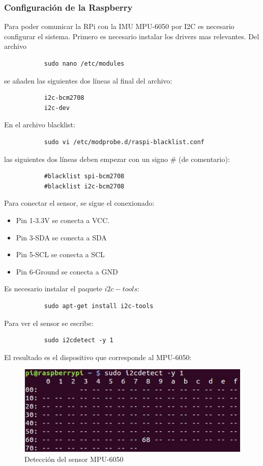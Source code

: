 \documentclass[twoside,11pt]{book}
\begin{document}
\subsubsection*{Configuración de la Raspberry}
Para poder comunicar la RPi con la IMU MPU-6050 por I2C es necesario configurar el sistema. Primero es necesario instalar los drivers mas relevantes. Del archivo
\begin{verbatim}
           sudo nano /etc/modules
\end{verbatim}
se añaden las siguientes dos líneas al final del archivo:
\begin{verbatim}
           i2c-bcm2708
           i2c-dev
\end{verbatim}
En el archivo blacklist:
\begin{verbatim}
           sudo vi /etc/modprobe.d/raspi-blacklist.conf
\end{verbatim}
las siguientes dos líneas deben empezar con un signo \# (de comentario):
\begin{verbatim}
           #blacklist spi-bcm2708
           #blacklist i2c-bcm2708
\end{verbatim}
Para conectar el sensor, se sigue el conexionado:

\begin{itemize}
\item Pin 1-3.3V se conecta a VCC.
\item Pin 3-SDA se conecta a SDA
\item Pin 5-SCL se conecta a SCL
\item Pin 6-Ground se conecta a GND
\end{itemize} 
Es necesario instalar el paquete $i2c-tools$:
\begin{verbatim}
           sudo apt-get install i2c-tools
\end{verbatim}
Para ver el sensor se escribe:
\begin{verbatim}
           sudo i2cdetect -y 1
\end{verbatim}
El resultado es el dispositivo que corresponde al MPU-6050:

\begin{figure}[h!]
\begin{center}
\includegraphics[scale=0.7,bb=0 0 350 178]{images/i2cdetect.png}
\caption{Detección del sensor MPU-6050}
\end{center}
\end{figure}
\end{document}
